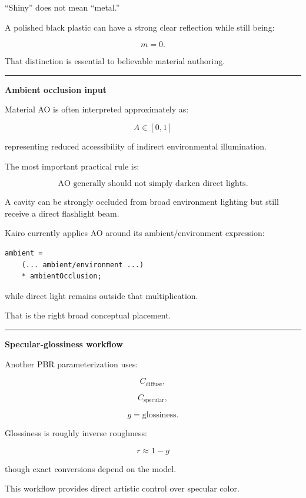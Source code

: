 ``Shiny'' does not mean ``metal.''

A polished black plastic can have a strong clear reflection while still being:

\[
m=0.
\]

That distinction is essential to believable material authoring.

\begin{center}\rule{0.5\linewidth}{0.5pt}\end{center}

\textbf{Ambient occlusion input}

Material AO is often interpreted approximately as:

\[
A\in[0,1]
\]

representing reduced accessibility of indirect environmental illumination.

The most important practical rule is:

\[
\boxed{
\text{AO generally should not simply darken direct lights}.
}
\]

A cavity can be strongly occluded from broad environment lighting but still receive a direct flashlight beam.

Kairo currently applies AO around its ambient/environment expression:

\begin{verbatim}
ambient =
    (... ambient/environment ...)
    * ambientOcclusion;
\end{verbatim}

while direct light remains outside that multiplication.

That is the right broad conceptual placement.

\begin{center}\rule{0.5\linewidth}{0.5pt}\end{center}

\textbf{Specular-glossiness workflow}

Another PBR parameterization uses:

\[
C_{\text{diffuse}},
\]

\[
C_{\text{specular}},
\]

\[
g=\text{glossiness}.
\]

Glossiness is roughly inverse roughness:

\[
r\approx1-g
\]

though exact conversions depend on the model.

This workflow provides direct artistic control over specular color.

